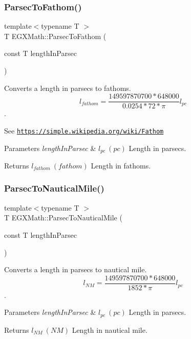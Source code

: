 \subsubsection{\texorpdfstring{Parsec\+To\+Fathom()}{ParsecToFathom()}}
{\footnotesize\ttfamily template$<$typename T $>$ \\
T E\+G\+X\+Math\+::\+Parsec\+To\+Fathom (\begin{DoxyParamCaption}\item[{const T}]{length\+In\+Parsec }\end{DoxyParamCaption})}



Converts a length in parsecs to fathoms. \[ l_{fathom}= \frac{149597870700 * 648000}{0.0254 * 72 * \pi} l_{pc} \]. 

See \href{https://simple.wikipedia.org/wiki/Fathom}{\tt https\+://simple.\+wikipedia.\+org/wiki/\+Fathom} 
\begin{DoxyParams}{Parameters}
{\em length\+In\+Parsec} & $ l_{pc}\ (pc)$ Length in parsecs. \\
\hline
\end{DoxyParams}
\begin{DoxyReturn}{Returns}
$ l_{fathom}\ (fathom)$ Length in fathoms. 
\end{DoxyReturn}
\mbox{\label{group___e_g_x_math-_conversions-_length_conversions-_astronomical-_parsec-_nautical_ga34adb714e6f4da104b25e2b5a2ab114e}} 
\subsubsection{\texorpdfstring{Parsec\+To\+Nautical\+Mile()}{ParsecToNauticalMile()}}
{\footnotesize\ttfamily template$<$typename T $>$ \\
T E\+G\+X\+Math\+::\+Parsec\+To\+Nautical\+Mile (\begin{DoxyParamCaption}\item[{const T}]{length\+In\+Parsec }\end{DoxyParamCaption})}



Converts a length in parsecs to nautical mile. \[ l_{NM}= \frac{149597870700 * 648000}{1852 * \pi} l_{pc} \]. 


\begin{DoxyParams}{Parameters}
{\em length\+In\+Parsec} & $ l_{pc}\ (pc)$ Length in parsecs. \\
\hline
\end{DoxyParams}
\begin{DoxyReturn}{Returns}
$ l_{NM}\ (NM)$ Length in nautical mile. 
\end{DoxyReturn}
